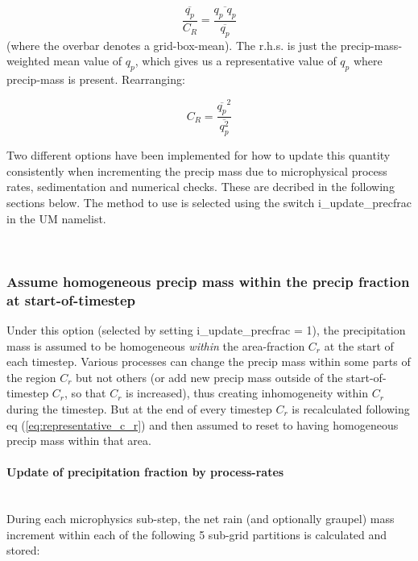 \documentclass{UMDP_article}
\begin{document}
\[
\frac{\overline{q_p}}{C_R}
= \frac{\overline{q_p \; q_p}}{\overline{q_p}}
\]
(where the overbar denotes a grid-box-mean).
The r.h.s. is just the precip-mass-weighted mean value of $q_p$,
which gives us a representative value of $q_p$ where precip-mass is present.
Rearranging:

\begin{equation} \label{eq:representative_c_r}
C_R = \frac{ \overline{q_p}^2 }{ \overline{q_p^2} }
\end{equation}

Two different options have been implemented for how to update this
quantity consistently when incrementing the precip mass due
to microphysical process rates, sedimentation and numerical checks.
These are decribed in the following sections below.
The method to use is selected using the switch i\_update\_precfrac
in the UM namelist.

~\\

\subsubsection{Assume homogeneous precip mass within the precip fraction
at start-of-timestep}

Under this option (selected by setting i\_update\_precfrac = 1),
the precipitation mass is assumed to be homogeneous {\em within}
the area-fraction $C_r$ at the start of each timestep.
Various processes can change the precip mass within some parts of the
region $C_r$ but not others (or add new precip mass outside of the
start-of-timestep $C_r$, so that $C_r$ is increased),
thus creating inhomogeneity within $C_r$ during the timestep.
But at the end of every timestep $C_r$ is recalculated following
eq (\ref{eq:representative_c_r}) and then assumed to reset to having
homogeneous precip mass within that area.

\paragraph{Update of precipitation fraction by process-rates}
\label{sec:precip_frac_update}
~\\

During each microphysics sub-step, the net rain (and optionally graupel)
mass increment within each of the following 5 sub-grid partitions is
calculated and stored:
\end{document}
